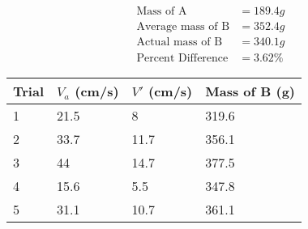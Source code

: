 \begin{equation*}
    \begin{aligned}
        \text{Mass of A}&=189.4g \\
        \text{Average mass of B}&=352.4g \\
        \text{Actual mass of B}&=340.1g \\
        \text{Percent Difference}&=3.62\%
    \end{aligned}    
\end{equation*}
\begin{table}[H]
    \begin{tabular}{|l|l|l|l|}
    \hline
    Trial & $V_a$ (cm/s) & $V'$ (cm/s) & Mass of B (g) \\ \hline
    1     & 21.5        & 8         & 319.6         \\ \hline
    2     & 33.7        & 11.7      & 356.1         \\ \hline
    3     & 44          & 14.7      & 377.5         \\ \hline
    4     & 15.6        & 5.5       & 347.8         \\ \hline
    5     & 31.1        & 10.7      & 361.1         \\ \hline
    \end{tabular}
    \end{table}
    